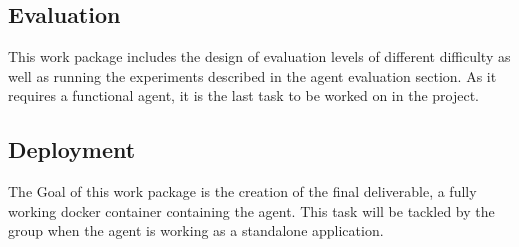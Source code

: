 \documentclass{article}
\begin{document}
\subsection{Evaluation}
This work package includes the design of evaluation levels of different difficulty as well as running the experiments described in the agent evaluation section. As it requires a functional agent, it is the last task to be worked on in the project.

\subsection{Deployment}
The Goal of this work package is the creation of the final deliverable, a fully working docker container containing the agent. 
This task will be tackled by the group when the agent is working as a standalone application.
\end{document}
